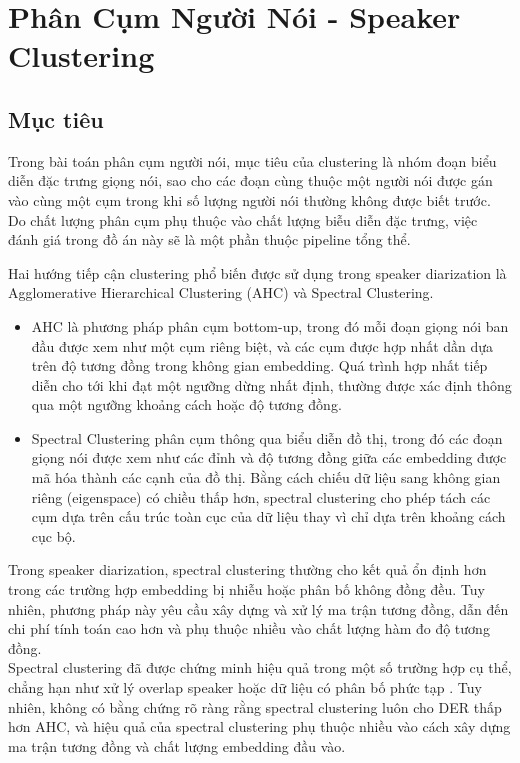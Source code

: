 \section{Phân Cụm Người Nói - Speaker Clustering}
\subsection{Mục tiêu}
Trong bài toán phân cụm người nói, mục tiêu của clustering là nhóm đoạn biểu diễn đặc trưng giọng nói, sao cho các đoạn cùng thuộc một người nói được gán vào cùng một cụm trong khi số lượng người nói thường không được biết trước. Do chất lượng phân cụm phụ thuộc vào chất lượng biễu diễn đặc trưng, việc đánh giá trong đồ án này sẽ là một phần thuộc pipeline tổng thể. 

Hai hướng tiếp cận clustering phổ biến được sử dụng trong speaker diarization là Agglomerative Hierarchical Clustering (AHC) và Spectral Clustering. 
\begin{itemize}[label={}]
    \item AHC là phương pháp phân cụm bottom-up, trong đó mỗi đoạn giọng nói ban đầu được xem như một cụm riêng biệt, và các cụm được hợp nhất dần dựa trên độ tương đồng trong không gian embedding. Quá trình hợp nhất tiếp diễn cho tới khi đạt một ngưỡng dừng nhất định, thường được xác định thông qua một ngưỡng khoảng cách hoặc độ tương đồng.
    \item Spectral Clustering phân cụm thông qua biểu diễn đồ thị, trong đó các đoạn giọng nói được xem như các đỉnh và độ tương đồng giữa các embedding được mã hóa thành các cạnh của đồ thị. Bằng cách chiếu dữ liệu sang không gian riêng (eigenspace) có chiều thấp hơn, spectral clustering cho phép tách các cụm dựa trên cấu trúc toàn cục của dữ liệu thay vì chỉ dựa trên khoảng cách cục bộ.

\end{itemize}
Trong speaker diarization, spectral clustering thường cho kết quả ổn định hơn trong các trường hợp embedding bị nhiễu hoặc phân bố không đồng đều. Tuy nhiên, phương pháp này yêu cầu xây dựng và xử lý ma trận tương đồng, dẫn đến chi phí tính toán cao hơn và phụ thuộc nhiều vào chất lượng hàm đo độ tương đồng. \\
Spectral clustering đã được chứng minh hiệu quả trong một số trường hợp cụ thể, chẳng hạn như xử lý overlap speaker hoặc dữ liệu có phân bố phức tạp \cite{Park_2020}. Tuy nhiên, không có bằng chứng rõ ràng rằng spectral clustering luôn cho DER thấp hơn AHC, và hiệu quả của spectral clustering phụ thuộc nhiều vào cách xây dựng ma trận tương đồng và chất lượng embedding đầu vào.